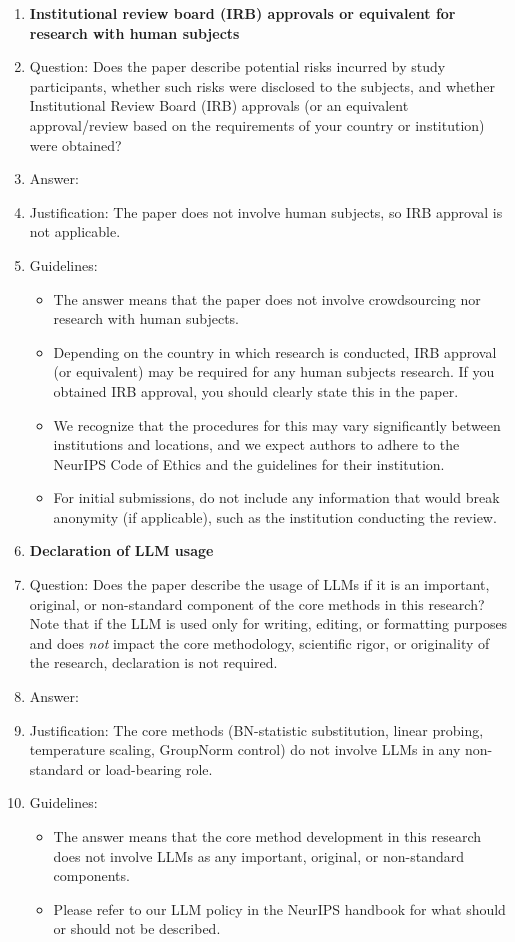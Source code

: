 \documentclass{article}
\begin{document}
\begin{enumerate}
\item {\bf Institutional review board (IRB) approvals or equivalent for research with human subjects}
    \item[] Question: Does the paper describe potential risks incurred by study participants, whether such risks were disclosed to the subjects, and whether Institutional Review Board (IRB) approvals (or an equivalent approval/review based on the requirements of your country or institution) were obtained?
    \item[] Answer: \answerNA{}
    \item[] Justification: The paper does not involve human subjects, so IRB approval is not applicable.
    \item[] Guidelines:
    \begin{itemize}
        \item The answer \answerNA{} means that the paper does not involve crowdsourcing nor research with human subjects.
        \item Depending on the country in which research is conducted, IRB approval (or equivalent) may be required for any human subjects research. If you obtained IRB approval, you should clearly state this in the paper.
        \item We recognize that the procedures for this may vary significantly between institutions and locations, and we expect authors to adhere to the NeurIPS Code of Ethics and the guidelines for their institution.
        \item For initial submissions, do not include any information that would break anonymity (if applicable), such as the institution conducting the review.
    \end{itemize}

\item {\bf Declaration of LLM usage}
    \item[] Question: Does the paper describe the usage of LLMs if it is an important, original, or non-standard component of the core methods in this research? Note that if the LLM is used only for writing, editing, or formatting purposes and does \emph{not} impact the core methodology, scientific rigor, or originality of the research, declaration is not required.
    \item[] Answer: \answerNA{}
    \item[] Justification: The core methods (BN-statistic substitution, linear probing, temperature scaling, GroupNorm control) do not involve LLMs in any non-standard or load-bearing role.
    \item[] Guidelines:
    \begin{itemize}
        \item The answer \answerNA{} means that the core method development in this research does not involve LLMs as any important, original, or non-standard components.
        \item Please refer to our LLM policy in the NeurIPS handbook for what should or should not be described.
    \end{itemize}

\end{enumerate}
\end{document}
